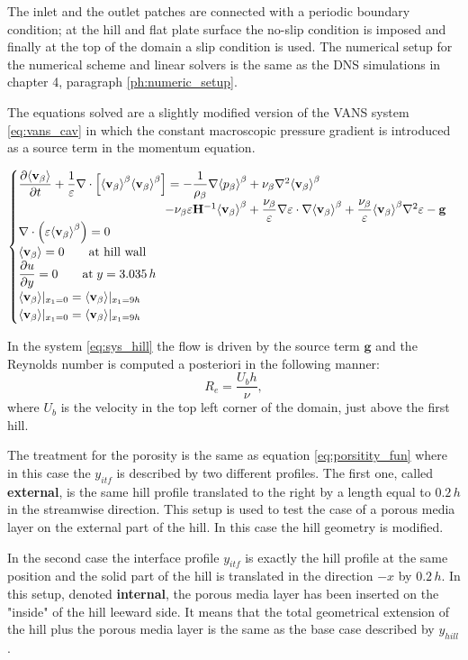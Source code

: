The inlet and the outlet patches are connected with a periodic boundary condition; at the hill and flat plate surface the no-slip condition is imposed and finally at the top of the domain a slip condition is used.
The numerical setup for the numerical scheme and linear solvers is the same as the DNS simulations in chapter 4, paragraph \ref{ph:numeric_setup}.

The equations solved are a slightly modified version of the VANS system \eqref{eq:vans_cav} in which the constant macroscopic pressure gradient is introduced as a source term in the momentum equation.

\begin{eqnarray}
\begin{cases}
\dfrac{\partial {\left< \textbf{v}_{\beta} \right>}}{\partial t} + \dfrac{1}{\varepsilon} \nabla \cdot \left[  {\left< \textbf{v}_{\beta} \right>}^{\beta}  {\left< \textbf{v}_{\beta} \right>}^{\beta} \right] = -\dfrac{1}{\rho_{\beta}} \nabla {\left< p_{\beta}\right>}^{\beta} + \nu_{\beta} \nabla^2 {\left< \textbf{v}_{\beta} \right>}^{\beta} \\ 
\qquad \qquad \qquad \qquad \qquad \qquad- \nu_{\beta} \varepsilon \mathbf{H}^{-1} {\left< \textbf{v}_{\beta} \right>}^{\beta} +\dfrac{\nu_{\beta}}{\varepsilon} \nabla \varepsilon \cdot \nabla {\left< \textbf{v}_{\beta} \right>}^{\beta} + \dfrac{\nu_{\beta}}{\varepsilon} {\left< \textbf{v}_{\beta} \right>}^{\beta} \nabla^2 \varepsilon - \mathbf{g}\\
\nabla \cdot \left(\varepsilon {\left< \textbf{v}_{\beta} \right>}^{\beta} \right) = 0\\
{\left< \textbf{v}_{\beta} \right>} = 0 \qquad \textrm{at hill wall} \\
\dfrac{\partial u}{\partial y}=0 \qquad \textrm{at} \; y = 3.035\,h\\
{\left< \textbf{v}_{\beta} \right>}|_{x_1 = 0} = {\left< \textbf{v}_{\beta} \right>}|_{x_1 = 9h} \\
{\left< \textbf{v}_{\beta} \right>}|_{x_1 = 0} = {\left< \textbf{v}_{\beta} \right>}|_{x_1 = 9h} 
\end{cases}
\label{eq:sys_hill}
\end{eqnarray}

In the system \eqref{eq:sys_hill} the flow is driven by the source term $\mathbf{g}$ and the Reynolds number is computed a posteriori in the following manner:
$$
R_e = \dfrac{U_b h}{\nu},
$$
where $U_b$ is the velocity in the top left corner of the domain, just above the first hill.

The treatment for the porosity is the same as equation \eqref{eq:porsitity_fun} where in this case the $y_{itf}$ is described by two different profiles.
The first one, called \textbf{external}, is the same hill profile translated to the right by a length equal to $0.2\,h$ in the streamwise direction. This setup is used to test the case of a porous media layer on the external part of the hill. In this case the hill geometry is modified.

In the second case the interface profile $y_{itf}$ is exactly the hill profile at the same position and the solid part of the hill is translated in the direction $-x$ by $0.2\,h$. In this setup, denoted \textbf{internal}, the porous media layer has been inserted on the "inside" of the hill leeward side. It means that the total geometrical extension of the hill plus the porous media layer is the same as the base case described by $y_{hill}$.

